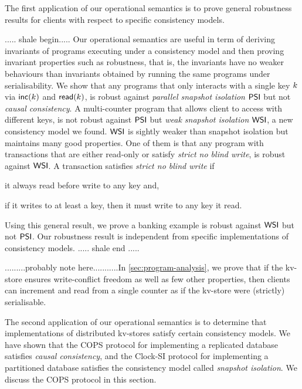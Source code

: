 
The first application of our operational semantics is to prove
general robustness results for clients with respect to specific
consistency models. 

..... shale begin.....
Our operational semantics are useful in term of deriving invariants of programs executing 
under a consistency model and
then proving invariant properties such as robustness, that is, the invariants have no weaker behaviours
than invariants obtained by running the same programs under serialisability.
We show that any programs that only interacts with  
a single key \( k \) via \( \mathsf{inc}(k)\) and \( \mathsf{read}(k)\),
is robust against \emph{parallel snapshot isolation} \( \mathsf{PSI} \) but not \emph{causal consistency}.
A multi-counter program that allows client to access with different keys, is not robust against 
\( \mathsf{PSI} \) but \emph{weak snapshot isolation} \( \mathsf{WSI} \), 
a new consistency model we found.
\( \mathsf{WSI} \) is sightly weaker than snapshot isolation but maintains many good properties.
One of them is that 
any program with transactions that are either read-only or satisfy \emph{strict no blind write},
is robust against \( \mathsf{WSI} \).
A transaction satisfies \emph{strict no blind write} if 
\begin{enumerate*}
    \item it always read before write to any key and,
    \item if it writes to at least a key, then it must write to any key it read.
\end{enumerate*}
Using this general result, 
we prove a banking example \cite{bank-example-wsi} is robust against \( \mathsf{WSI} \) but not \( \mathsf{PSI} \).
Our robustness result is independent from specific implementations of consistency models.
..... shale end .....


.........probably note here...........In \cref{sec:program-analysis}, we prove that if the kv-store 
ensures write-conflict freedom as well as few other properties, then clients can increment 
and read from a single counter as if the kv-store were (strictly) serialisable.



The second application of our operational
semantics is to determine that implementations of distributed
kv-stores satisfy certain consistency models. We have shown that the
COPS protocol \citep{cops} for implementing a replicated database satisfies {\em
  causal consistency},  and the Clock-SI protocol \citep{clocksi} for implementing a
partitioned database satisfies the consistency model called {\em
  snapshot isolation}. We discuss the  COPS protocol  in this section. 

